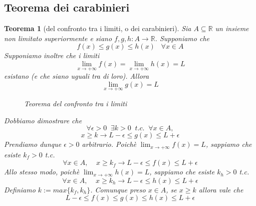 \documentclass[a4paper]{article}
\newtheorem{theorem}{Teorema}
\theoremstyle{break}
\theoremstyle{break}
\theoremstyle{break}
\theoremstyle{break}
\begin{document}
\subsection{Teorema dei carabinieri}
\begin{theorem}[del confronto tra i limiti, o dei carabinieri]
	Sia \( A \subseteq \mathbb{R} \) un insieme non limitato superiormente e siano
	\( f,g,h: A \to \mathbb{R} \). Supponiamo che
	\[
		f(x) \le g(x) \le h(x)\;\;\;\forall x \in A
	\]
	Supponiamo inoltre che i limiti
	\[
		\lim_{x \to +\infty} f(x) = \lim_{x \to +\infty} h(x) = L
	\]
	esistano (e che siano uguali tra di loro). Allora
	\[
		\lim_{x \to +\infty} g(x) = L
	\]
	\begin{figure}[H]
		\begin{center}
		\end{center}
		\caption{Teorema del confronto tra i limiti}
	\end{figure}
	Dobbiamo dimostrare che
	\[
		\forall \epsilon > 0\;\; \exists k>0\; \;t.c.\;\; \forall x \in A,
	\]
	\[
		x \ge k \to L-\epsilon \le g(x) \le L+\epsilon
	\]
	Prendiamo dunque \( \epsilon>0 \) arbitrario. Poichè \( \lim_{x \to +\infty} f(x)=L\),
	sappiamo che esiste \( k_f >0 \) t.c.
	\[
		\forall x \in A,\;\;\;\; x \ge k_f \to L-\epsilon \le f(x) \le L+\epsilon
	\]
	Allo stesso modo, poichè \( \lim_{x \to +\infty} h(x)=L\),
	sappiamo che esiste \( k_h >0 \) t.c.
	\[
		\forall x \in A,\;\;\;\; x \ge k_h \to L-\epsilon \le h(x) \le L+\epsilon
	\]
	Definiamo \( k:= max\{k_f,k_h\} \). Comunque preso \( x \in A \),
	se \( x \ge k \) allora vale che
	\[
		L-\epsilon \le f(x) \le g(x) \le h(x) \le L+\epsilon
	\]

\end{theorem}
\end{document}
